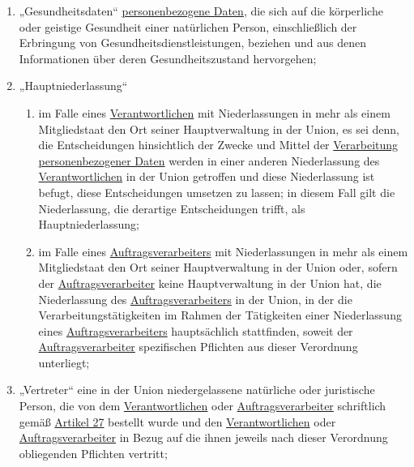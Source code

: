\begin{enumerate}
  \item „Gesundheitsdaten“ \hyperref[itm:04-1]{personenbezogene Daten}, die sich auf die körperliche oder geistige
   Gesundheit einer natürlichen Person, einschließlich der Erbringung von Gesundheitsdienstleistungen, beziehen und aus
   denen Informationen über deren Gesundheitszustand hervorgehen;%
  \label{itm:04-15}

  \item „Hauptniederlassung“%
  \label{itm:04-16}

  \begin{enumerate}
  
    \item im Falle eines \hyperref[itm:04-7]{Verantwortlichen} mit Niederlassungen in mehr als einem Mitgliedstaat den
     Ort seiner Hauptverwaltung in der Union, es sei denn, die Entscheidungen hinsichtlich der Zwecke und Mittel
     der \hyperref[itm:04-2]{Verarbeitung}
     \hyperref[itm:04-1]{personenbezogener Daten} werden in einer anderen Niederlassung des \hyperref[itm:04-7]
      {Verantwortlichen} in der Union getroffen und diese Niederlassung ist befugt, diese Entscheidungen umsetzen zu
      lassen; in diesem Fall gilt die Niederlassung, die derartige Entscheidungen trifft, als Hauptniederlassung;%
    \label{itm:04-16a}

    \item im Falle eines \hyperref[itm:04-8]{Auftragsverarbeiters} mit Niederlassungen in mehr als einem Mitgliedstaat
     den Ort seiner Hauptverwaltung in der Union oder, sofern der \hyperref[itm:04-8]{Auftragsverarbeiter} keine
     Hauptverwaltung in der Union hat, die Niederlassung des \hyperref[itm:04-8]{Auftragsverarbeiters} in der Union, in
     der die Verarbeitungstätigkeiten im Rahmen der Tätigkeiten einer Niederlassung eines \hyperref[itm:04-8]
     {Auftragsverarbeiters} hauptsächlich stattfinden, soweit der \hyperref[itm:04-8]{Auftragsverarbeiter} spezifischen
     Pflichten aus dieser Verordnung unterliegt;%
    \label{itm:04-16b}

  \end{enumerate}

  \item „Vertreter“ eine in der Union niedergelassene natürliche oder juristische Person, die von dem \hyperref
   [itm:04-7]{Verantwortlichen} oder \hyperref[itm:04-8]{Auftragsverarbeiter} schriftlich gemäß \hyperref[ch:27]
   {Artikel 27} bestellt wurde und den \hyperref[itm:04-7]{Verantwortlichen} oder
   \hyperref[itm:04-8]{Auftragsverarbeiter} in Bezug auf die ihnen jeweils nach dieser Verordnung obliegenden Pflichten
    vertritt;%
  \label{itm:04-17}


\end{enumerate}
